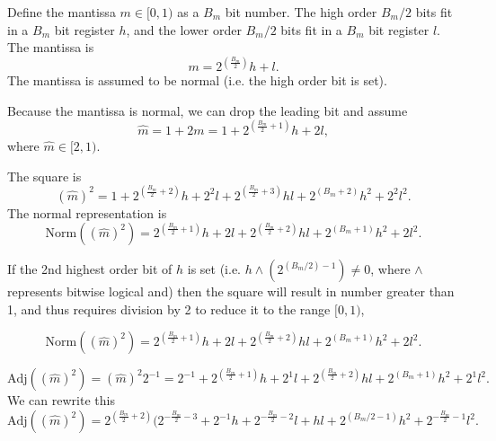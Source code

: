 \documentclass{amsart}
\newcommand{\BE}{\begin{equation}}
\newcommand{\EE}{\end{equation}}
\begin{document}
Define the mantissa $m \in [0,1)$ as a $B_m$ bit number. The high order $B_m / 2$ bits fit in a $B_m$ bit register $h$, and the lower order $B_m / 2$ bits fit in a $B_m$ bit register $l$. The mantissa is
\BE m = 2^{\left(\frac{B_m}{2}\right)} h + l. \EE
The mantissa is assumed to be normal (i.e. the high order bit is set).

Because the mantissa is normal, we can drop the leading bit and assume
\BE \hat{m} = 1 + 2 m = 1 + 2^{\left(\frac{B_m}{2} + 1\right)} h + 2 l,\EE
where $\hat{m} \in [2,1)$.



The square is
\BE \left(\hat{m}\right)^2 = 1 + 2^{\left(\frac{B_m}{2} + 2\right)} h + 2^2 l + 2^{\left(\frac{B_m}{2} + 3\right)} h l + 2^{\left(B_m + 2\right)} h^2 + 2^2 l^2.\EE
The normal representation is
\BE \mathrm{Norm}\left(\left(\hat{m}\right)^2\right) = 2^{\left(\frac{B_m}{2} + 1\right)} h + 2 l + 2^{\left(\frac{B_m}{2} + 2\right)} h l + 2^{\left(B_m + 1\right)} h^2 + 2 l^2.\EE

If the 2nd highest order bit of $h$ is set (i.e. $h \land (2^{(B_m / 2) - 1}) \neq 0$, where $\land$ represents bitwise logical and) then the square will result in number greater than 1, and thus requires division by 2 to reduce it to the range $[0,1)$,

\BE \mathrm{Norm}\left(\left(\hat{m}\right)^2\right) = 2^{\left(\frac{B_m}{2} + 1\right)} h + 2 l + 2^{\left(\frac{B_m}{2} + 2\right)} h l + 2^{\left(B_m + 1\right)} h^2 + 2 l^2.\EE


\BE \mathrm{Adj}\left(\left(\hat{m}\right)^2\right) = \left(\hat{m}\right)^2 2^{-1} = 2^{-1} + 2^{\left(\frac{B_m}{2} + 1\right)} h + 2^1 l + 2^{\left(\frac{B_m}{2} + 2\right)} h l + 2^{\left(B_m + 1\right)} h^2 + 2^1 l^2. \EE
We can rewrite this
\BE \mathrm{Adj}\left(\left(\hat{m}\right)^2\right) = 2^{\left(\frac{B_m}{2} + 2\right)} (2^{-\frac{B_m}{2} - 3} + 2^{-1} h + 2^{-\frac{B_m}{2} - 2} l + h l + 2^{\left(B_m / 2 - 1\right)} h^2 + 2^{-\frac{B_m}{2} - 1} l^2. \EE
\end{document}
